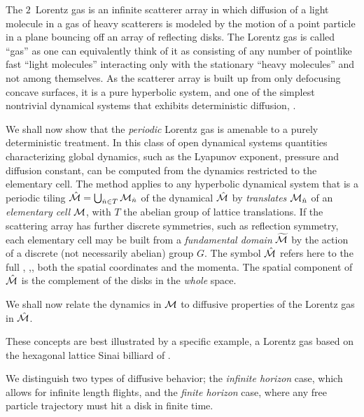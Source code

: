 \documentclass[aps,pre,preprint,groupedaddress, floatfix]{revtex4-1}
\begin{document}
The $2$\dmn\ Lorentz gas is an infinite scatterer array in which
diffusion of a light molecule in a gas of heavy scatterers is modeled
by the motion of a point particle in a plane bouncing off an array of
reflecting disks.  The Lorentz gas is called ``gas'' as one can
equivalently think of it as consisting of any number of pointlike fast
``light molecules'' interacting only with the stationary ``heavy
molecules'' and not among themselves.  As the scatterer array is built
up from only defocusing concave surfaces, it is a pure hyperbolic
system, and one of the simplest nontrivial dynamical systems that
exhibits deterministic diffusion, .


We shall now show that the {\em periodic} Lorentz gas is amenable to a
purely deterministic treatment.  In this class of open dynamical
systems quantities characterizing global dynamics, such as the
Lyapunov exponent, pressure and diffusion constant, can be computed
from the dynamics restricted to the elementary cell.  The method
applies to any hyperbolic dynamical system that is a periodic tiling
$\hat {{\cal M}}=\bigcup_{ \hat n \in T} {\cal M}_{\hat n}$ of the dynamical {\statesp} $\hat {{\cal M}}$
by {\em translates} ${\cal M}_{\hat n}$ of an {\em elementary cell} ${\cal M}$,
with $T$ the abelian group of lattice translations.  If the scattering
array has further discrete symmetries, such as reflection symmetry,
each elementary cell may be built from a {\em fundamental domain}
${\widetilde {{\cal M}}}$ by the action of a discrete (not necessarily
abelian) group $G$.  The symbol $\hat {{\cal M}}$ refers here to the full
{\statesp}, \ie,, both the spatial coordinates and the momenta.  The
spatial component of $\hat {{\cal M}}$ is the complement of the disks in the {\em
whole} space.

We shall now relate the dynamics in ${\cal M}$ to diffusive properties of
the Lorentz gas in $\hat {{\cal M}}$.

These concepts are best illustrated by a specific example, a Lorentz
gas based on the hexagonal lattice Sinai billiard of
.

We distinguish two types of diffusive behavior; the {\em infinite
horizon} case, which allows for infinite length flights, and the {\em
finite horizon} case, where any free particle trajectory must hit a
disk in finite time. 
\end{document}
